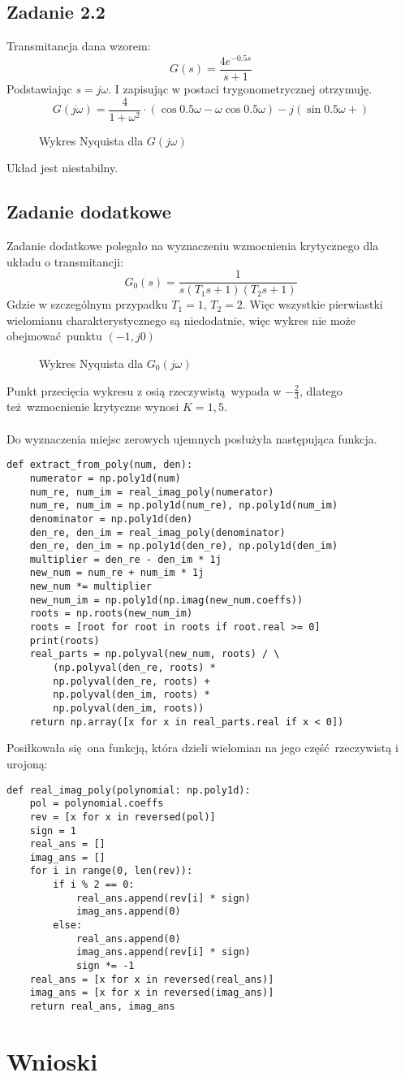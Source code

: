 \documentclass[a4paper, 12pt]{article}
\begin{document}
		\subsection{Zadanie 2.2}
			Transmitancja dana wzorem:
			$$
				G(s) = \frac{4 e^ {-0.5s}}{s + 1}
			$$
			Podstawiając $s = j\omega$. I zapisując w postaci trygonometrycznej otrzymuję.
			$$
				G(j\omega) = \frac{4}{1 + \omega^2}
				\cdot(\cos 0.5\omega - \omega \cos 0.5\omega) - j(\sin0.5\omega + )
			$$
			\begin{figure}[H]
				\centering
				\def \svgwidth{0.7\columnwidth}
				
				\caption{Wykres Nyquista dla $G(j\omega)$}
			\end{figure}\noindent
			Układ jest niestabilny.
		\subsection{Zadanie dodatkowe}
		Zadanie dodatkowe polegało na wyznaczeniu wzmocnienia krytycznego dla układu o transmitancji:
		$$
			G_0(s) = \frac{1}{s(T_1s+1)(T_2s+1)}
		$$
		Gdzie w szczególnym przypadku $T_1 = 1$, $T_2 = 2$. Więc wszystkie pierwiastki wielomianu charakterystycznego są niedodatnie, więc wykres nie może obejmować punktu $(-1, j0)$
		\begin{figure}[H]
			\centering
			\def \svgwidth{0.7\columnwidth}
			
			\caption{Wykres Nyquista dla $G_0(j\omega)$}
		\end{figure}\noindent
		Punkt przecięcia wykresu z osią rzeczywistą wypada w $-\frac{2}{3}$, dlatego też wzmocnienie krytyczne wynosi $K = 1,5$.
		\\ \\
		Do wyznaczenia miejsc zerowych ujemnych posłużyła następująca funkcja.
\begin{lstlisting}
def extract_from_poly(num, den):
	numerator = np.poly1d(num)
	num_re, num_im = real_imag_poly(numerator)
	num_re, num_im = np.poly1d(num_re), np.poly1d(num_im)
	denominator = np.poly1d(den)
	den_re, den_im = real_imag_poly(denominator)
	den_re, den_im = np.poly1d(den_re), np.poly1d(den_im)
	multiplier = den_re - den_im * 1j
	new_num = num_re + num_im * 1j
	new_num *= multiplier
	new_num_im = np.poly1d(np.imag(new_num.coeffs))
	roots = np.roots(new_num_im)
	roots = [root for root in roots if root.real >= 0]
	print(roots)
	real_parts = np.polyval(new_num, roots) / \
	    (np.polyval(den_re, roots) *
	    np.polyval(den_re, roots) +
	    np.polyval(den_im, roots) *
	    np.polyval(den_im, roots))
	return np.array([x for x in real_parts.real if x < 0])
\end{lstlisting}
		Posiłkowała się ona funkcją, która dzieli wielomian na jego część rzeczywistą i urojoną:
\begin{lstlisting}
def real_imag_poly(polynomial: np.poly1d):
	pol = polynomial.coeffs
	rev = [x for x in reversed(pol)]
	sign = 1
	real_ans = []
	imag_ans = []
	for i in range(0, len(rev)):
		if i % 2 == 0:
			real_ans.append(rev[i] * sign)
			imag_ans.append(0)
		else:
			real_ans.append(0)
			imag_ans.append(rev[i] * sign)
			sign *= -1
	real_ans = [x for x in reversed(real_ans)]
	imag_ans = [x for x in reversed(imag_ans)]
	return real_ans, imag_ans
\end{lstlisting}
	\section{Wnioski}
		
\end{document}

